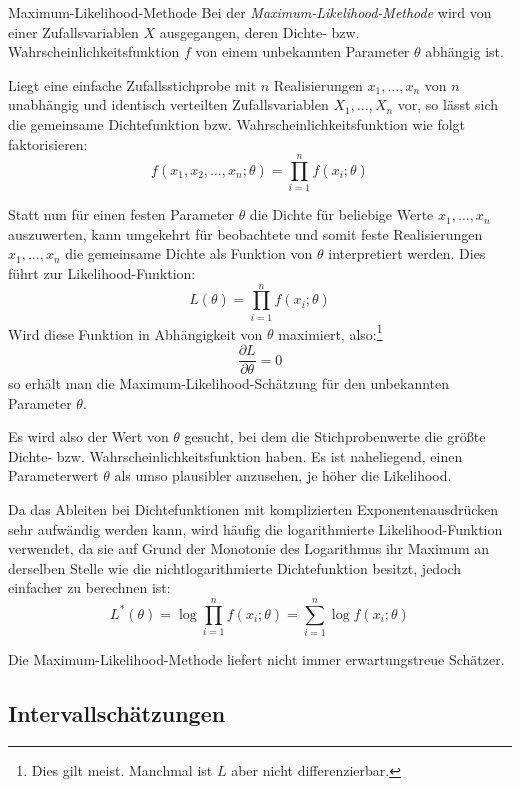 \begin{algo}{Maximum-Likelihood-Methode}
    Bei der \emph{Maximum-Likelihood-Methode} wird von einer Zufallsvariablen $X$ ausgegangen, deren Dichte- bzw. Wahrscheinlichkeitsfunktion $f$ von einem unbekannten Parameter $\theta$ abhängig ist.

    Liegt eine einfache Zufallsstichprobe mit $n$ Realisierungen $x_1, \ldots, x_n$ von $n$ unabhängig und identisch verteilten Zufallsvariablen $X_1, \ldots, X_n$ vor, so lässt sich die gemeinsame Dichtefunktion bzw. Wahrscheinlichkeitsfunktion wie folgt faktorisieren:
    \[
        f(x_1, x_2, \ldots, x_n ; \theta) = \prod_{i=1}^n f(x_i ; \theta)
    \]

    Statt nun für einen festen Parameter $\theta$ die Dichte für beliebige Werte $x_1, \ldots, x_n$ auszuwerten,  kann umgekehrt für beobachtete und somit feste Realisierungen $x_1, \ldots, x_n$ die gemeinsame Dichte als Funktion von $\theta$ interpretiert werden.
    Dies führt zur Likelihood-Funktion:
    \[
        L(\theta) = \prod_{i=1}^n f(x_i ; \theta)
    \]
    Wird diese Funktion in Abhängigkeit von $\theta$ maximiert, also:\footnote{Dies gilt meist. Manchmal ist $L$ aber nicht differenzierbar.}
    \[
        \frac{\partial L}{\partial \theta} = 0
    \]
    so erhält man die Maximum-Likelihood-Schätzung für den unbekannten Parameter $\theta$.

    Es wird also der Wert von $\theta$ gesucht, bei dem die Stichprobenwerte die größte Dichte- bzw. Wahrscheinlichkeitsfunktion haben.
    Es ist naheliegend, einen Parameterwert $\theta$ als umso plausibler anzusehen, je höher die Likelihood.

    Da das Ableiten bei Dichtefunktionen mit komplizierten Exponentenausdrücken sehr aufwändig werden kann, wird häufig die logarithmierte Likelihood-Funktion  verwendet, da sie auf Grund der Monotonie des Logarithmus ihr Maximum an derselben Stelle wie die nichtlogarithmierte Dichtefunktion besitzt, jedoch einfacher zu berechnen ist:
    \[
        L^*(\theta) = \log \prod_{i=1}^n f(x_i ; \theta) = \sum_{i=1}^n \log f(x_i ; \theta)
    \]

    Die Maximum-Likelihood-Methode liefert nicht immer erwartungstreue Schätzer.
\end{algo}

\subsection{Intervallschätzungen}

